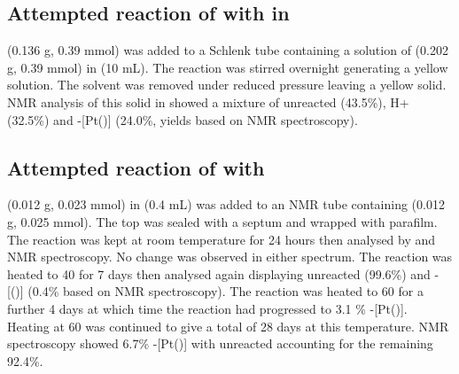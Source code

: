 \subsection*{Attempted reaction of \tButhixantphos{} with \ce{[Pt(C6H10)Cl2]} in\\}

\ce{[Pt(C6H10)Cl2]} (0.136 g, 0.39 mmol) was added to a Schlenk tube containing a solution of  \tButhixantphos{} (0.202 g, 0.39 mmol) in  (10 mL).  The reaction was stirred overnight generating a yellow solution.  The solvent was removed under reduced pressure leaving a yellow solid.  NMR analysis of this solid in  showed a mixture of unreacted \tButhixantphos{} (43.5\%), \tButhixantphos H+ (32.5\%) and \trans-[Pt(\tButhixantphos)] (24.0\%, yields based on \phosphorus{} NMR spectroscopy).  


\subsection*{Attempted reaction of \tButhixantphos{} with }

\tBuThixantphos{} (0.012 g, 0.023 mmol) in  (0.4 mL) was added to an NMR tube containing  (0.012 g, 0.025 mmol).  The top was sealed with a septum and wrapped with parafilm.  The reaction was kept at room temperature for 24 hours then analysed by \proton{} and \phosphorus{} NMR spectroscopy.  No change was observed in either spectrum.  The reaction was heated to 40 \degC{} for 7 days then analysed again displaying unreacted \tButhixantphos{} (99.6\%) and \trans-[(\tButhixantphos)] (0.4\% based on \phosphorus{} NMR spectroscopy).  The reaction was heated to 60 \degC{} for a further 4 days at which time the reaction had progressed to 3.1 \% \trans-[Pt(\tButhixantphos)].  Heating at 60 \degC{} was continued to give a total of 28 days at this temperature.  NMR spectroscopy showed 6.7\% \trans-[Pt(\tButhixantphos)] with unreacted \tButhixantphos{} accounting for the remaining 92.4\%.

